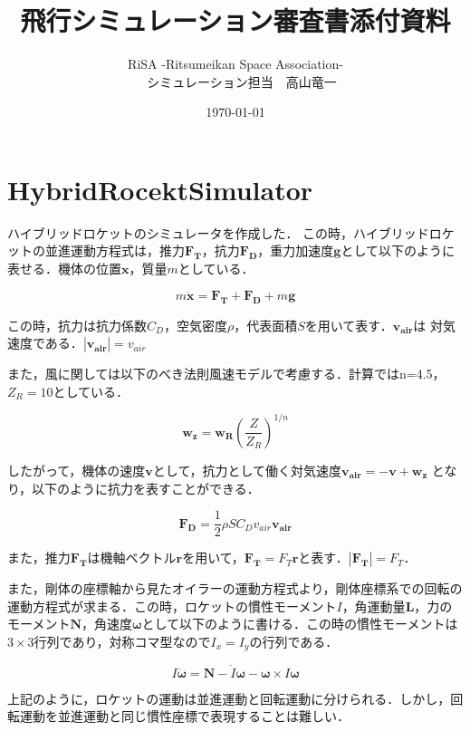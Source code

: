 \documentclass{jsarticle}
\title{飛行シミュレーション審査書添付資料}
\author{RiSA -Ritsumeikan Space Association- \\　シミュレーション担当　高山竜一}
\date{\today}
\begin{document}
\maketitle


\section{HybridRocektSimulator}
ハイブリッドロケットのシミュレータを作成した．
この時，ハイブリッドロケットの並進運動方程式は，推力$\bm{F_T}$，抗力$\bm{F_D}$，重力加速度$\bm{g}$として以下のように表せる．機体の位置$\bm{x}$，質量$m$としている．

\begin{equation}
m \bm{\ddot{x}} = \bm{F_T} + \bm{F_D} + m\bm{g}
\end{equation}

この時，抗力は抗力係数$C_D$，空気密度$\rho$，代表面積$S$を用いて表す．$\bm{v_{air}}$は
対気速度である．$|\bm{v_{air}}| = v_{air}$

また，風に関しては以下のべき法則風速モデルで考慮する．計算ではn=4.5，$Z_R=10$としている．

\begin{equation}
  \bm{w_z} = \bm{w_R} (\frac{Z}{Z_R})^{1/n}
\end{equation}

したがって，機体の速度$\bm{v}$として，抗力として働く対気速度$\bm{v_{air}} = - \bm{v} + \bm{w_z}$
となり，以下のように抗力を表すことができる．

\begin{equation}
\bm{F_D} = \frac{1}{2} \rho S C_D v_{air} \bm{v_{air}}
\end{equation}

また，推力$\bm{F_T}$は機軸ベクトル$\bm{r}$を用いて，$\bm{F_T} = F_T \bm{r}$と表す．$|\bm{F_T}| = F_T$．


また，剛体の座標軸から見たオイラーの運動方程式より，剛体座標系での回転の運動方程式が求まる．この時，ロケットの慣性モーメント$I$，角運動量$\bm{L}$，力のモーメント$\bm{N}$，角速度$\bm{\omega}$として以下のように書ける．この時の慣性モーメントは$3\times3$行列であり，対称コマ型なので$I_x = I_y$の行列である．

\begin{equation}
I \bm{\ddot{\omega}} = \bm{N} - \dot{I}\bm{\omega} - \bm{\omega} \times I \bm{\omega}
\end{equation}

上記のように，ロケットの運動は並進運動と回転運動に分けられる．しかし，回転運動を並進運動と同じ慣性座標で表現することは難しい．
\end{document}
